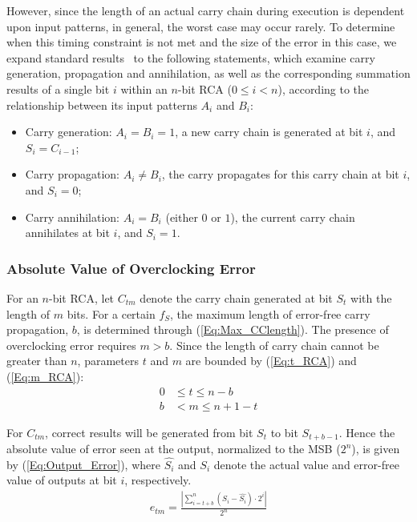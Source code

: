 \documentclass[prodmode,acmtrets]{acmsmall} %
\begin{document}
However, since the length of an actual carry chain during execution is dependent upon input patterns, in general, the worst case may occur rarely. To determine when this timing constraint is not met and the size of the error in this case, we expand standard results~\cite{DigitalICDesign} to the following statements, which examine carry generation, propagation and annihilation, as well as the corresponding summation results of a single bit $i$ within an $n$-bit RCA ($0\leq i<n$), according to the relationship between its input patterns $A_i$ and $B_i$:
%
 \begin{itemize}
   \item Carry generation: $A_i=B_i=1$, a new carry chain is generated at bit $i$, and $S_i=C_{i-1}$;
   \item Carry propagation: $A_i\neq B_i$, the carry propagates for this carry chain at bit $i$, and $S_i=0$;
   \item Carry annihilation: $A_i=B_i$ (either $0$ or $1$), the current carry chain annihilates at bit $i$, and $S_i=1$.
 \end{itemize}

 \subsubsection{Absolute Value of Overclocking Error}
For an $n$-bit RCA, let $C_{tm}$ denote the carry chain generated at bit $S_t$ with the length of $m$ bits. For a certain $f_S$, the maximum length of error-free carry propagation, $b$, is determined through (\ref{Eq:Max_CClength}). The presence of overclocking error requires $m>b$. Since the length of carry chain cannot be greater than $n$, parameters $t$ and $m$ are bounded by (\ref{Eq:t_RCA}) and (\ref{Eq:m_RCA}):
%
\begin{align}
  \label{Eq:t_RCA}  0&\leq t \leq n-b\\
    b&<m\leq n+1-t      \label{Eq:m_RCA}
\end{align}

For $C_{tm}$, correct results will be generated from bit $S_t$ to bit $S_{t+b-1}$. Hence the absolute value of error seen at the output, normalized to the MSB ($2^n$), is given by (\ref{Eq:Output_Error}), where $\hat{S_i}$ and $S_i$ denote the actual value and error-free value of outputs at bit $i$, respectively.
%
\begin{eqnarray}\label{Eq:Output_Error}
    e_{tm}=\frac{\left|\sum_{i=t+b}^{n}(S_i-\hat{S_i})\cdot 2^i\right|}{2^n}
\end{eqnarray}
\end{document}
